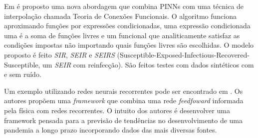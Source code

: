 Em \cite{schiassi-etal:21-xtfc} é proposto uma nova abordagem que combina PINNs
com uma técnica de interpolação chamada Teoria de Conexões Funcionais.
O algoritmo funciona aproximando funções por expressões condicionadas, uma expressão
condicionada uma é a soma de funções livres e um funcional que analiticamente satisfaz
as condições impostas não importando quais funções livres são escolhidas.
O modelo proposto é feito \textit{SIR}, \textit{SEIR} e \textit{SEIRS} 
(Susceptible-Exposed-Infectious-Recovered-Susceptible, um \textit{SEIR} com reinfecção). 
São feitos testes com dados sintéticos com e sem ruído.

Um exemplo utilizando redes neurais recorrentes pode ser encontrado 
em \cite{rodriguez-etal:2022-einns}. Os autores propõem uma \textit{framework} 
que combina uma rede \textit{feedfoward} informada pela física com redes recorrentes.
O intuito dos autores é desenvolver uma framework pensada para a previsão de 
tendências no desenvolvimento de uma pandemia a longo prazo incorporando dados 
das mais diversas fontes.

